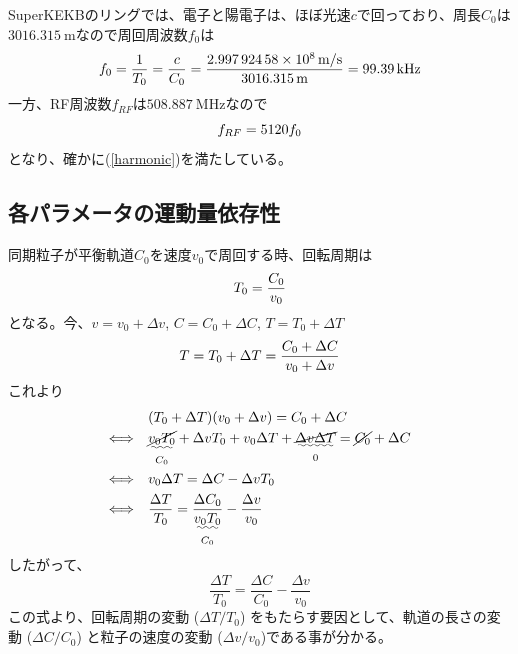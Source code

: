 \documentclass[10pt,a4paper]{ltjsarticle}
\begin{document}
\begin{tcolorbox}[title=\textgt{SuperKEKBにおける$f_{RF}$, $f_{0}$, $h$}の関係]
    SuperKEKBのリングでは、電子と陽電子は、ほぼ光速$c$で回っており、周長$C_0$は$\SI{3016.315}{\meter}$なので周回周波数$f_0$は
    \begin{equation}
      f_0 = \frac{1}{T_0}=\frac{c}{C_0}=\frac{\SI{2.99792458e8}{\meter / \second}}{\SI{3016.315}{\meter}}=\SI{99.39}{\kilo\hertz} \notag
    \end{equation}
    一方、RF周波数$f_{RF}$は$\SI{508.887}{\mega\hertz}$なので
    \begin{equation}
        f_{RF} = 5120 f_0 \notag
    \end{equation}
    となり、確かに(\ref{harmonic})を満たしている。
\end{tcolorbox}

\subsection{各パラメータの運動量依存性}
同期粒子が平衡軌道$C_0$を速度$v_0$で周回する時、回転周期は
%
\begin{equation}
    T_0 = \frac{C_0}{v_0} \notag
\end{equation}
%
となる。今、$v = v_0 + \Delta v$, $C = C_0 + \Delta C$, $T=T_0 + \Delta T$
%
\begin{equation}
    T = T_0 + \Delta T = \frac{C_0 + \Delta C}{v_0 + \Delta v}\notag
\end{equation}
%
これより
%
\begin{align}
    & (T_0 + \Delta T)(v_0 + \Delta v) = C_0 + \Delta C \notag \\
    \Longleftrightarrow\quad & \underset{C_0}{\uwave{\cancel{v_0 T_0}}} + \Delta v T_0 + v_0 \Delta T +
    \underset{0}{\uwave{\cancel{\Delta v \Delta T}}}
    = \cancel{C_0} + \Delta C \notag \\
    \Longleftrightarrow\quad & v_0 \Delta T = \Delta C- \Delta v T_0 \notag \\
    \Longleftrightarrow\quad & \frac{\Delta T}{T_0} = \frac{\Delta C_0}{\underset{C_0}{\uwave{v_0 T_0}}} - \frac{\Delta v}{v_0} \notag
\end{align}
%
したがって、
%
\begin{equation}
    \frac{\Delta T}{T_0} = \frac{\Delta C}{C_0} - \frac{\Delta v}{v_0}
\end{equation}
%
この式より、回転周期の変動 ($\Delta T/T_0$) をもたらす要因として、軌道の長さの変動 ($\Delta C/C_0$) と粒子の速度の変動 ($\Delta v/v_0$)である事が分かる。
\end{document}
